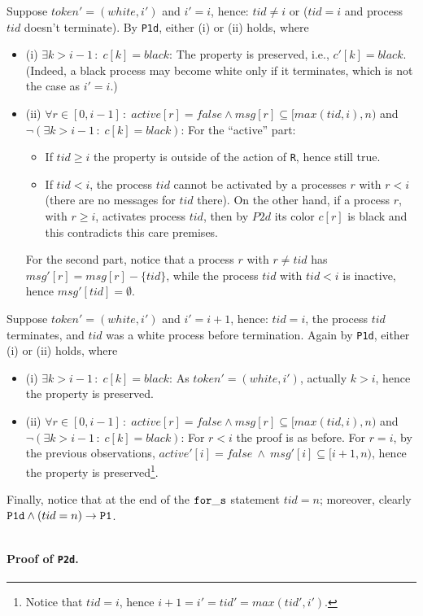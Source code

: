 \documentclass[runningheads]{llncs}
\newcommand{\1}{\u{a}}
\newcommand{\2}{\c{s}}
\newcommand{\5}{\c{t}}
\newcommand{\8}{\^{\i}}
\newcommand{\9}{\^{a}}
\newcommand{\bi}{\begin{itemize}}
\newcommand{\ei}{\end{itemize}}
\newcommand{\foo}[1]{\footnote{#1}}
\newcommand{\ra}{\rightarrow}
\newcommand{\co}{\,\colon\;}
\begin{document}
Suppose $token'=(white,i')$ and $i'=i$, hence: $tid\not=i$ or ($tid=i$ and process $tid$ doesn't
terminate). By {\tt P1d}, either (i) or (ii) holds, where\bi
\item[(i)] $\exists k>i-1\co c[k]=black$: The property is preserved, i.e., $c'[k]=black$. (Indeed, a black
process may become white only if it terminates, which is not the case as $i'=i$.)
\item[(ii)] $\forall r\in[0,i-1]\co active[r]=false\wedge msg[r]\subseteq[max(tid,i),n)$ and $\neg(\exists
k>i-1\co c[k]=black)$: For the ``active'' part: \bi
\item If $tid\geq i$ the property is outside of the action of {\tt R}, hence still true. 
\item If $tid<i$, the process $tid$ cannot be activated by a processes $r$ with $r<i$ (there are no messages
for $tid$ there). On the other hand, if a process $r$, with $r\geq i$, activates process $tid$, then by $P2d$
its color $c[r]$ is black and this contradicts this care premises. \ei For the second part, notice that a
process $r$ with $r\not=tid$ has $msg'[r]=msg[r]-\{tid\}$, while the process $tid$ with $tid<i$ is inactive,
hence $msg'[tid]=\emptyset$.  \ei

Suppose $token'=(white,i')$ and $i'=i+1$, hence: $tid=i$, the process $tid$ terminates, and $tid$ was a white
process before termination. Again by {\tt P1d}, either (i) or (ii) holds, where\bi
\item[(i)] $\exists k>i-1\co c[k]=black$: As $token'=(white,i')$, actually $k>i$, hence the property is
preserved.
\item[(ii)] $\forall r\in[0,i-1]\co active[r]=false\wedge msg[r]\subseteq[max(tid,i),n)$ and $\neg(\exists
k>i-1\co c[k]=black)$: For $r<i$ the proof is as before. For $r=i$, by the previous observations,
$active'[i]=false\ \wedge\ msg'[i]\subseteq[i+1,n)$, hence the property is preserved\foo{Notice that $tid=i$,
hence $i+1=i'=tid'=max(tid',i')$.}.  \ei
 
Finally, notice that at the end of the ${\tt for\_s}$ statement $tid=n$; moreover, clearly ${\tt P1d}\wedge
(tid=n)\ra {\tt P1}$.

${}$\vspace{-.8cm}\paragraph{Proof of {\tt P2d}.}
\end{document}
